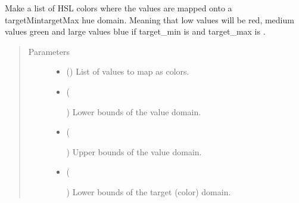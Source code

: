 \documentclass[letterpaper,10pt,english]{sphinxmanual}
\begin{document}
\begin{fulllineitems}
\label{\detokenize{cockatoo:cockatoo.utilities.map_values_as_colors}}
Make a list of HSL colors where the values are mapped onto a
targetMin\sphinxhyphen{}targetMax hue domain. Meaning that low values will be red, medium
values green and large values blue if target\_min is  and target\_max
is .
\begin{quote}\begin{description}
\item[{Parameters}] \leavevmode\begin{itemize}
\item {} 
 () \textendash{} List of values to map as colors.

\item {} 
 (%
\begin{footnote}[55]\sphinxAtStartFootnote
{}
%
\end{footnote}) \textendash{} Lower bounds of the value domain.

\item {} 
 (%
\begin{footnote}[56]\sphinxAtStartFootnote
{}
%
\end{footnote}) \textendash{} Upper bounds of the value domain.

\item {} 
 (%
\begin{footnote}[57]\sphinxAtStartFootnote
{}
%
\end{footnote}\sphinxstyleliteralemphasis{\sphinxupquote{, }}) \textendash{} 
Lower bounds of the target (color) domain.


\end{itemize}
\end{description}
\end{quote}
\end{fulllineitems}
\end{document}
